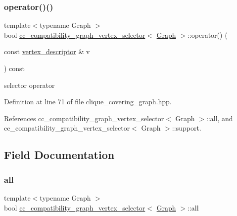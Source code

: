 \subsubsection{\texorpdfstring{operator()()}{operator()()}}
{\footnotesize\ttfamily template$<$typename Graph $>$ \\
bool \hyperlink{structcc__compatibility__graph__vertex__selector}{cc\+\_\+compatibility\+\_\+graph\+\_\+vertex\+\_\+selector}$<$ \hyperlink{structGraph}{Graph} $>$\+::operator() (\begin{DoxyParamCaption}\item[{const \hyperlink{structcc__compatibility__graph__vertex__selector_a445b79c6570f741f69230996f98df72b}{vertex\+\_\+descriptor} \&}]{v }\end{DoxyParamCaption}) const\hspace{0.3cm}{\ttfamily [inline]}}



selector operator 



Definition at line 71 of file clique\+\_\+covering\+\_\+graph.\+hpp.



References cc\+\_\+compatibility\+\_\+graph\+\_\+vertex\+\_\+selector$<$ Graph $>$\+::all, and cc\+\_\+compatibility\+\_\+graph\+\_\+vertex\+\_\+selector$<$ Graph $>$\+::support.



\subsection{Field Documentation}
\mbox{\label{structcc__compatibility__graph__vertex__selector_ae9a1879eeca1b4125dee12853f9606ae}} 
\subsubsection{\texorpdfstring{all}{all}}
{\footnotesize\ttfamily template$<$typename Graph $>$ \\
bool \hyperlink{structcc__compatibility__graph__vertex__selector}{cc\+\_\+compatibility\+\_\+graph\+\_\+vertex\+\_\+selector}$<$ \hyperlink{structGraph}{Graph} $>$\+::all\hspace{0.3cm}{\ttfamily [private]}}



